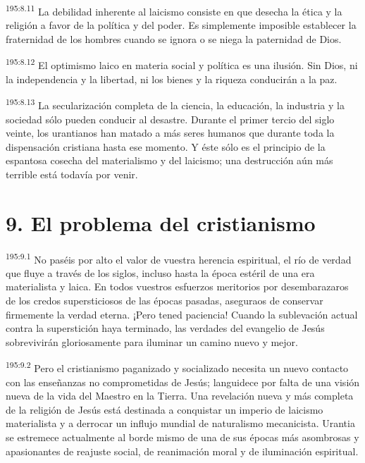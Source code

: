 \par
\textsuperscript{195:8.11} La debilidad inherente al laicismo consiste en que desecha la ética y la religión a favor de la política y del poder. Es simplemente imposible establecer la fraternidad de los hombres cuando se ignora o se niega la paternidad de Dios.

\par
\textsuperscript{195:8.12} El optimismo laico en materia social y política es una ilusión. Sin Dios, ni la independencia y la libertad, ni los bienes y la riqueza conducirán a la paz.

\par
\textsuperscript{195:8.13} La secularización completa de la ciencia, la educación, la industria y la sociedad sólo pueden conducir al desastre. Durante el primer tercio del siglo veinte, los urantianos han matado a más seres humanos que durante toda la dispensación cristiana hasta ese momento. Y éste sólo es el principio de la espantosa cosecha del materialismo y del laicismo; una destrucción aún más terrible está todavía por venir.

\section*{9. El problema del cristianismo}
\par
\textsuperscript{195:9.1} No paséis por alto el valor de vuestra herencia espiritual, el río de verdad que fluye a través de los siglos, incluso hasta la época estéril de una era materialista y laica. En todos vuestros esfuerzos meritorios por desembarazaros de los credos supersticiosos de las épocas pasadas, aseguraos de conservar firmemente la verdad eterna. ¡Pero tened paciencia! Cuando la sublevación actual contra la superstición haya terminado, las verdades del evangelio de Jesús sobrevivirán gloriosamente para iluminar un camino nuevo y mejor.

\par
\textsuperscript{195:9.2} Pero el cristianismo paganizado y socializado necesita un nuevo contacto con las enseñanzas no comprometidas de Jesús; languidece por falta de una visión nueva de la vida del Maestro en la Tierra. Una revelación nueva y más completa de la religión de Jesús está destinada a conquistar un imperio de laicismo materialista y a derrocar un influjo mundial de naturalismo mecanicista. Urantia se estremece actualmente al borde mismo de una de sus épocas más asombrosas y apasionantes de reajuste social, de reanimación moral y de iluminación espiritual.

